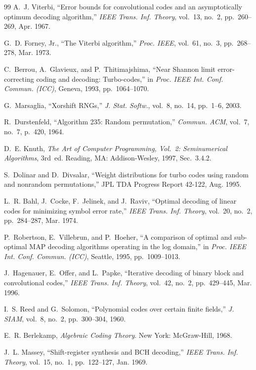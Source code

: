 \documentclass[11pt,a4paper]{article}
\theoremstyle{remark}
\begin{document}
\begin{thebibliography}{99}
A.~J. Viterbi, ``Error bounds for convolutional codes and an asymptotically optimum decoding algorithm,'' \emph{IEEE Trans. Inf. Theory}, vol.~13, no.~2, pp.~260--269, Apr. 1967.

G.~D. Forney, Jr., ``The Viterbi algorithm,'' \emph{Proc. IEEE}, vol.~61, no.~3, pp.~268--278, Mar. 1973.

C.~Berrou, A.~Glavieux, and P.~Thitimajshima, ``Near Shannon limit error-correcting coding and decoding: Turbo-codes,'' in \emph{Proc. IEEE Int. Conf. Commun. (ICC)}, Geneva, 1993, pp.~1064--1070.

G.~Marsaglia, ``Xorshift RNGs,'' \emph{J. Stat. Softw.}, vol.~8, no.~14, pp.~1--6, 2003.

R.~Durstenfeld, ``Algorithm 235: Random permutation,'' \emph{Commun. ACM}, vol.~7, no.~7, p.~420, 1964.

D.~E. Knuth, \emph{The Art of Computer Programming, Vol.~2: Seminumerical Algorithms}, 3rd~ed. Reading, MA: Addison-Wesley, 1997, Sec.~3.4.2.

S.~Dolinar and D.~Divsalar, ``Weight distributions for turbo codes using random and nonrandom permutations,'' JPL TDA Progress Report 42-122, Aug. 1995.

L.~R. Bahl, J.~Cocke, F.~Jelinek, and J.~Raviv, ``Optimal decoding of linear codes for minimizing symbol error rate,'' \emph{IEEE Trans. Inf. Theory}, vol.~20, no.~2, pp.~284--287, Mar. 1974.

P.~Robertson, E.~Villebrun, and P.~Hoeher, ``A comparison of optimal and sub-optimal MAP decoding algorithms operating in the log domain,'' in \emph{Proc. IEEE Int. Conf. Commun. (ICC)}, Seattle, 1995, pp.~1009--1013.

J.~Hagenauer, E.~Offer, and L.~Papke, ``Iterative decoding of binary block and convolutional codes,'' \emph{IEEE Trans. Inf. Theory}, vol.~42, no.~2, pp.~429--445, Mar. 1996.

I.~S. Reed and G.~Solomon, ``Polynomial codes over certain finite fields,'' \emph{J. SIAM}, vol.~8, no.~2, pp.~300--304, 1960.

E.~R. Berlekamp, \emph{Algebraic Coding Theory}. New York: McGraw-Hill, 1968.

J.~L. Massey, ``Shift-register synthesis and BCH decoding,'' \emph{IEEE Trans. Inf. Theory}, vol.~15, no.~1, pp.~122--127, Jan. 1969.


\end{thebibliography}
\end{document}
